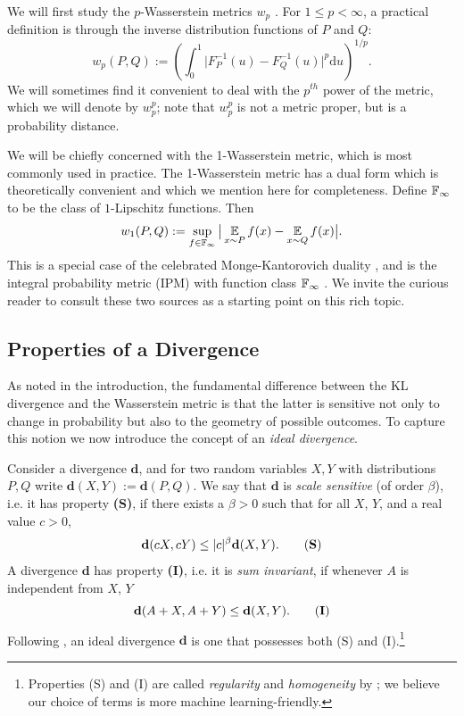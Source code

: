 \documentclass{article}
\def \dive {\mathbf{d}}
\def \wass {w}
\def \du {\textrm{d} u}
\begin{document}
We will first study the $p$-Wasserstein metrics $\wass_p$ \citep{dudley2002real}.
For $1 \le p < \infty$, a practical definition is through the inverse distribution functions of $P$ and $Q$:
\begin{equation}
\wass_p(P, Q) := \left ( \int_0^1 \big |F^{-1}_P(u) - F^{-1}_Q(u)\big |^p \du \right )^{1/p}.\label{eqn:primal_wasserstein}
\end{equation}
We will sometimes find it convenient to deal with the $p^\mathit{th}$ power of the metric, which we will denote by $\wass_p^p$; note that $\wass_p^p$ is not a metric proper, but is a probability distance.

%
We will be chiefly concerned with the 1-Wasserstein metric, which is most commonly used in practice. 
The 1-Wasserstein metric has a dual form which is theoretically convenient and which we mention here for completeness. %
Define $\mathbb{F}_\infty$ to be the class of $1$-Lipschitz functions. Then
\begin{equation}\label{eqn:ipm_wasserstein}
\wass_1(P, Q) := \sup_{f \in \bF_\infty} \big | \expect_{x \sim P} f(x) - \expect_{x \sim Q} f(x) \big |.
\end{equation}
This is a special case of the celebrated Monge-Kantorovich duality \citep{rachev13methods}, and is the integral probability metric (IPM) with function class $\mathbb{F}_\infty$ \citep{muller97integral}. We invite the curious reader to consult these two sources as a starting point on this rich topic.

\subsection{Properties of a Divergence}

As noted in the introduction, the fundamental difference between the KL divergence and the Wasserstein metric is that the latter is sensitive not only to change in probability but also to the geometry of possible outcomes. %
To capture this notion we now introduce the concept of an \emph{ideal divergence}.

Consider a divergence $\dive$, and for two random variables $X, Y$ with distributions $P, Q$  write $\dive(X, Y) := \dive(P, Q)$. We say that $\dive$ is \emph{scale sensitive} (of order $\beta$), i.e. it has property \textbf{(S)}, if there exists a $\beta > 0$ such that for all $X$, $Y$, and a real value $c > 0$,
\begin{equation}
\dive(cX, cY) \le |c|^\beta \dive(X, Y). \tag{\textbf{S}}
\end{equation}
A divergence $\dive$ has property \textbf{(I)}, i.e. it is \emph{sum invariant}, if whenever $A$ is independent from $X$, $Y$
\begin{equation}
\dive(A + X, A + Y) \le \dive(X, Y). \tag{\textbf{I}}
\end{equation}
Following \citet{zolotarev76metric}, an ideal divergence $\dive$ is one that possesses both (S) and (I).\footnote{Properties (S) and (I) are called \emph{regularity} and \emph{homogeneity} by \citeauthor{zolotarev76metric}; we believe our choice of terms is more machine learning-friendly.}
\end{document}
